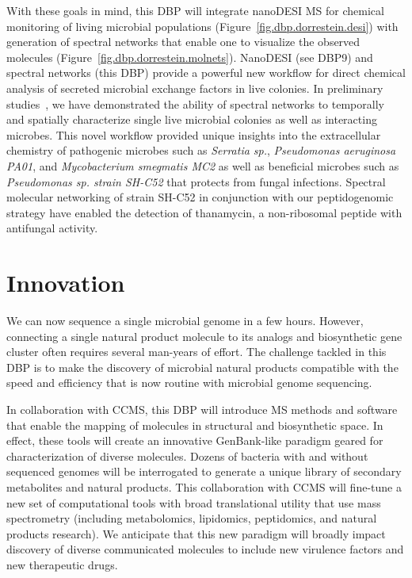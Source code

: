 \documentclass[arial,11pt]{article}
\begin{document}
With these goals in mind, this DBP will integrate  nanoDESI MS for chemical monitoring of living microbial populations
(Figure~\ref{fig.dbp.dorrestein.desi})
with generation of spectral networks that enable one to visualize the observed molecules
(Figure~\ref{fig.dbp.dorrestein.molnets}).  NanoDESI (see DBP9) and spectral networks (this DBP) provide a powerful new workflow for direct chemical analysis of secreted microbial exchange factors in live colonies. In preliminary studies~\cite{watrous12,moree12}, we have demonstrated the ability of spectral networks to temporally and spatially characterize single live microbial colonies as well as interacting microbes. This novel workflow provided unique insights into the extracellular chemistry of pathogenic microbes such as {\em Serratia sp.}, {\em Pseudomonas aeruginosa PA01}, and {\em Mycobacterium smegmatis MC2} as well as beneficial microbes such as {\em Pseudomonas sp. strain SH-C52} that protects from fungal infections. Spectral molecular networking of strain SH-C52 in conjunction with our peptidogenomic strategy have enabled the detection of thanamycin, a non-ribosomal peptide with antifungal activity.

\section{Innovation}


We can now sequence a single microbial genome in a few hours. However, connecting a single natural product molecule to its analogs and biosynthetic gene cluster often requires  several man-years of effort. The challenge tackled in this DBP is to make the discovery of microbial natural products compatible with the speed and efficiency that is now routine with microbial genome sequencing.

In collaboration with CCMS, this DBP will introduce MS methods and software that enable the mapping of molecules in structural and biosynthetic space. In effect, these tools will create an innovative GenBank-like paradigm geared for characterization of diverse molecules. Dozens of bacteria with and without sequenced genomes will be interrogated to generate a unique library of secondary metabolites and natural products. This  collaboration with CCMS will fine-tune a new set of computational tools with broad translational utility
that use mass spectrometry (including metabolomics, lipidomics, peptidomics, and natural products research). We anticipate that this new paradigm will broadly impact  discovery of diverse communicated molecules to include new virulence factors and new therapeutic drugs.
\end{document}
